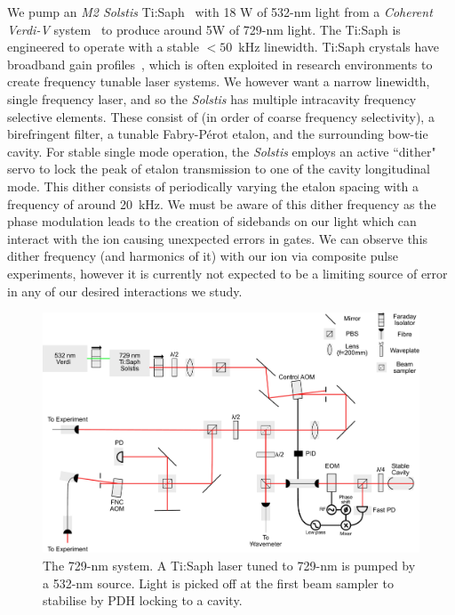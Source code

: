 \documentclass[12pt]{report}
\begin{document}
    We pump an \emph{M2 Solstis} Ti:Saph~\cite{XXX} with 18 W of 532-nm light
    from a \emph{Coherent Verdi-V} system~\cite{XXX} to produce around 5W of
    729-nm light.  The Ti:Saph is engineered to operate with a stable $<50$~kHz
    linewidth. Ti:Saph crystals have broadband gain profiles~\cite{XXX}, which
    is often exploited in research environments to create frequency tunable
    laser systems. We however want a narrow linewidth, single frequency laser,
    and so the \emph{Solstis} has multiple intracavity frequency selective
    elements. These consist of (in order of coarse frequency selectivity), a
    birefringent filter, a tunable Fabry-P\'erot etalon, and the surrounding
    bow-tie cavity. For stable single mode operation, the \emph{Solstis} employs
    an active ``dither" servo to lock the peak of etalon transmission to one of
    the cavity longitudinal mode. This dither consists of periodically varying
    the etalon spacing with a frequency of around 20~kHz. We must be aware of
    this dither frequency as the phase modulation leads to the creation of
    sidebands on our light which can interact with the ion causing unexpected
    errors in gates. We can observe this dither frequency (and harmonics of it)
    with our ion via composite pulse experiments, however it is currently not
    expected to be a limiting source of error in any of our desired interactions
    we study.\\
    \begin{figure}
    \begin{center}
    \noindent\includegraphics[width=0.9\linewidth]{figures/pdf_figure/729_path_small.pdf}
    \end{center}
    \caption{The 729-nm system. A Ti:Saph laser tuned to 729-nm is
        pumped by a 532-nm source. Light is picked off at the first beam
        sampler to stabilise by PDH locking to a cavity.}
    \label{fig:729}
    \end{figure}
\end{document}
